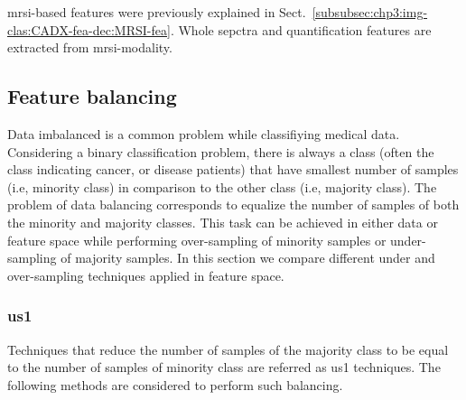 \ac{mrsi}-based features were previously explained in Sect.~\ref{subsubsec:chp3:img-clas:CADX-fea-dec:MRSI-fea}. 
Whole sepctra and quantification features are extracted from \ac{mrsi}-modality.
  
\subsection{Feature balancing}\label{subsec:chp6:method:fea-bal}
Data imbalanced is a common problem while classifiying medical data.
Considering a binary classification problem, there is always a class (often the class indicating cancer, or disease patients) that have smallest number of samples (i.e, minority class) in comparison to the other class (i.e, majority class).
The problem of data balancing corresponds to equalize the number of samples of both the minority and majority classes.
This task can be achieved in either data or feature space while performing over-sampling of minority samples or under-sampling of majority samples.
In this section we compare different under and over-sampling techniques applied in feature space.

\subsubsection{\Acl*{us1}}
Techniques that reduce the number of samples of the majority class to be equal to the number of samples of minority class are referred as \ac{us1} techniques.
The following methods are considered to perform such balancing.

